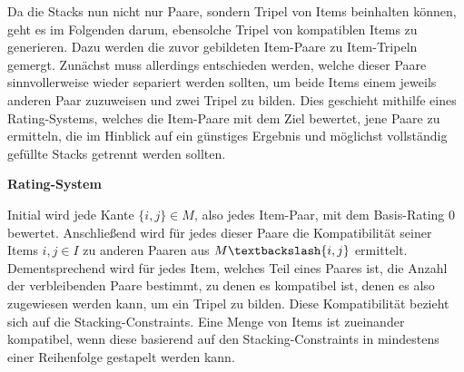 Da die Stacks nun nicht nur Paare, sondern Tripel von Items beinhalten können, geht es im Folgenden darum,
ebensolche Tripel von kompatiblen Items zu generieren. Dazu werden die zuvor gebildeten Item-Paare zu Item-Tripeln gemergt.
Zunächst muss allerdings entschieden werden, welche dieser Paare sinnvollerweise wieder separiert werden sollten,
um beide Items einem jeweils anderen Paar zuzuweisen und zwei Tripel zu bilden. Dies geschieht mithilfe eines Rating-Systems, welches die Item-Paare mit dem Ziel bewertet, jene Paare zu ermitteln, die im Hinblick auf ein günstiges Ergebnis
und möglichst vollständig gefüllte Stacks getrennt werden sollten.

\textbf{Rating-System}

Initial wird jede Kante $\{i, j\} \in M$, also jedes Item-Paar, mit dem Basis-Rating $0$ bewertet.
Anschließend wird für jedes dieser Paare die Kompatibilität seiner Items $i, j \in I$ zu anderen Paaren aus $M \textbackslash \{i, j\}$ ermittelt.
Dementsprechend wird für jedes Item, welches Teil eines Paares ist, die Anzahl der verbleibenden Paare bestimmt, zu denen es kompatibel ist, denen es also zugewiesen werden kann, um ein Tripel zu bilden. Diese Kompatibilität bezieht sich auf die Stacking-Constraints.
Eine Menge von Items ist zueinander kompatibel, wenn diese basierend auf den Stacking-Constraints in mindestens einer
Reihenfolge gestapelt werden kann.

